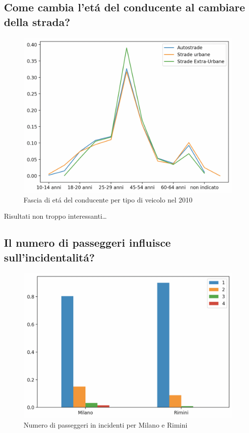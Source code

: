 \documentclass[a4paper]{report}
\begin{document}
\subsection{Come cambia l'et\'a del conducente al cambiare della strada?}

\begin{figure}
    \includegraphics[width=\linewidth]{../src/incidenti/incidenti_senza_coords/tipo_veicoli/differenza_eta.png}
    \caption{Fascia di et\'a del conducente per tipo di veicolo nel 2010}
    \label{fig:differenza_eta}
\end{figure}



Risultati non troppo interessanti\dots


\subsection{Il numero di passeggeri influisce sull'incidentalit\'a?}

\begin{figure}
    \includegraphics[width=\linewidth]{../src/incidenti/incidenti_senza_coords/tipo_veicoli/passeggeri.png}
    \caption{Numero di passeggeri in incidenti per Milano e Rimini}
    \label{fig:passeggeri_milano_rimini}
\end{figure}
\end{document}
